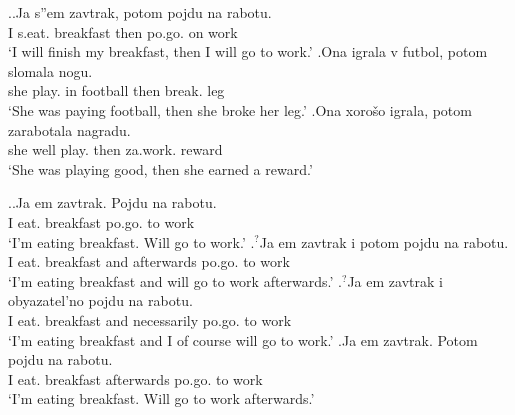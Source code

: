 \ex.\ag.\label{breakfast:potom}Ja s''em\textsuperscript{\PF} zavtrak, potom pojdu\textsuperscript{\PF} na rabotu.\\
I s.eat. breakfast then po.go. on work\\
\trans `I will finish my breakfast, then I will go to work.'
\bg.\label{football:potom}Ona igrala\textsuperscript{\IPF} v futbol, potom slomala\textsuperscript{\PF} nogu.\\
she play. in football then break. leg\\
\trans `She was paying football, then she broke her leg.'
\bg.\label{ex:cause:potom}Ona xoro\v{s}o igrala\textsuperscript{\IPF}, potom zarabotala\textsuperscript{\PF} nagradu.\\
she well play. then za.work. reward\\
\trans `She was playing good, then she earned a reward.'

\ex.\label{test3}\ag.\label{test31}Ja em\textsuperscript{\IPF} zavtrak. Pojdu\textsuperscript{\PF} na rabotu.\\ 
I eat. breakfast po.go. to work\\
\trans `I'm eating breakfast. Will go to work.'
\bg.\label{test32}$^?$Ja em\textsuperscript{\IPF} zavtrak i potom pojdu\textsuperscript{\PF} na rabotu.\\ 
I eat. breakfast and afterwards po.go. to work\\
\trans `I'm eating breakfast and will go to work afterwards.'
\bg.\label{test33}$^?$Ja em\textsuperscript{\IPF} zavtrak i obyazatel’no pojdu\textsuperscript{\PF} na rabotu.\\
I eat. breakfast and necessarily po.go. to work\\
\trans `I'm eating breakfast and I of course will go to work.'
\bg.\label{test34}Ja em\textsuperscript{\IPF} zavtrak. Potom pojdu\textsuperscript{\PF} na rabotu.\\
I eat. breakfast afterwards po.go. to work\\
\trans `I'm eating breakfast. Will go to work afterwards.'

